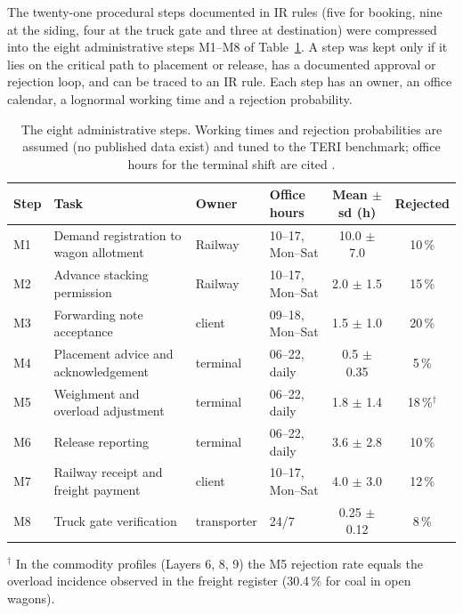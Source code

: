 The twenty-one procedural steps documented in IR rules (five for booking, nine at the siding, four at the truck gate and three at destination) were compressed into the eight administrative steps M1--M8 of Table~\ref{tab:steps}. A step was kept only if it lies on the critical path to placement or release, has a documented approval or rejection loop, and can be traced to an IR rule. Each step has an owner, an office calendar, a lognormal working time and a rejection probability.

\begin{table}[!htbp]
\centering
\caption[The eight administrative steps]{The eight administrative steps. Working times and rejection probabilities are assumed (no published data exist) and tuned to the TERI benchmark; office hours for the terminal shift are cited \cite{ircomp}.}
\label{tab:steps}
\small
\begin{tabularx}{\textwidth}{@{}l X l l c c@{}}
\toprule
\textbf{Step} & \textbf{Task} & \textbf{Owner} & \textbf{Office hours} & \textbf{Mean $\pm$ sd (h)} & \textbf{Rejected} \\
\midrule
M1 & Demand registration to wagon allotment & Railway & 10--17, Mon--Sat & 10.0 $\pm$ 7.0 & 10\,\% \\
M2 & Advance stacking permission & Railway & 10--17, Mon--Sat & 2.0 $\pm$ 1.5 & 15\,\% \\
M3 & Forwarding note acceptance & client & 09--18, Mon--Sat & 1.5 $\pm$ 1.0 & 20\,\% \\
M4 & Placement advice and acknowledgement & terminal & 06--22, daily & 0.5 $\pm$ 0.35 & 5\,\% \\
M5 & Weighment and overload adjustment & terminal & 06--22, daily & 1.8 $\pm$ 1.4 & 18\,\%$^{\dagger}$ \\
M6 & Release reporting & terminal & 06--22, daily & 3.6 $\pm$ 2.8 & 10\,\% \\
M7 & Railway receipt and freight payment & client & 10--17, Mon--Sat & 4.0 $\pm$ 3.0 & 12\,\% \\
M8 & Truck gate verification & transporter & 24/7 & 0.25 $\pm$ 0.12 & 8\,\% \\
\bottomrule
\end{tabularx}
\par\smallskip\raggedright\footnotesize $^{\dagger}$ In the commodity profiles (Layers 6, 8, 9) the M5 rejection rate equals the overload incidence observed in the freight register (30.4\,\% for coal in open wagons).
\end{table}

